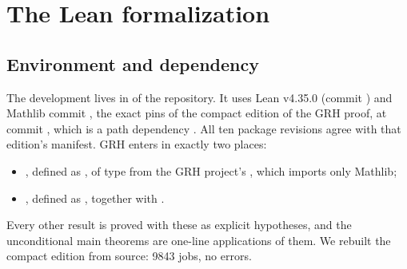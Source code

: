 \section{The Lean formalization}\label{sec:formal}

\subsection{Environment and dependency}
The development lives in  of the repository. It uses Lean v4.35.0 (commit ) and
Mathlib commit , the exact pins of the compact edition of the GRH proof,
 at commit , which is a path dependency \cite{grhlean}. All
ten package revisions agree with that edition's manifest. GRH enters in exactly two places:
\begin{itemize}
\item {}, defined as , of type
  from the GRH project's , which imports only Mathlib;
\item {}, defined as , together with
  .
\end{itemize}
Every other result is proved with these as explicit hypotheses, and the unconditional main theorems are
one-line applications of them. We rebuilt the compact edition from source: 9843 jobs, no errors.

